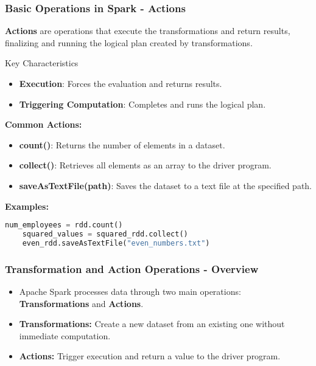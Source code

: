 \documentclass[aspectratio=169]{beamer}
\begin{document}
\begin{frame}[fragile]
    \frametitle{Basic Operations in Spark - Actions}
    \textbf{Actions} are operations that execute the transformations and return results, finalizing and running the logical plan created by transformations.

    \begin{block}{Key Characteristics}
        \begin{itemize}
            \item \textbf{Execution}: Forces the evaluation and returns results.
            \item \textbf{Triggering Computation}: Completes and runs the logical plan.
        \end{itemize}
    \end{block}

    \textbf{Common Actions:}
    \begin{itemize}
        \item \textbf{count()}: Returns the number of elements in a dataset.
        \item \textbf{collect()}: Retrieves all elements as an array to the driver program.
        \item \textbf{saveAsTextFile(path)}: Saves the dataset to a text file at the specified path.
    \end{itemize}

    \textbf{Examples:}
    \begin{lstlisting}[language=Python]
    num_employees = rdd.count()
    squared_values = squared_rdd.collect()
    even_rdd.saveAsTextFile("even_numbers.txt")
    \end{lstlisting}
\end{frame}

\begin{frame}[fragile]
    \frametitle{Transformation and Action Operations - Overview}
    \begin{itemize}
        \item Apache Spark processes data through two main operations: 
        \textbf{Transformations} and \textbf{Actions}.
        \item \textbf{Transformations:} Create a new dataset from an existing one 
        without immediate computation.
        \item \textbf{Actions:} Trigger execution and return a value to the driver program.
    \end{itemize}
\end{frame}
\end{document}
